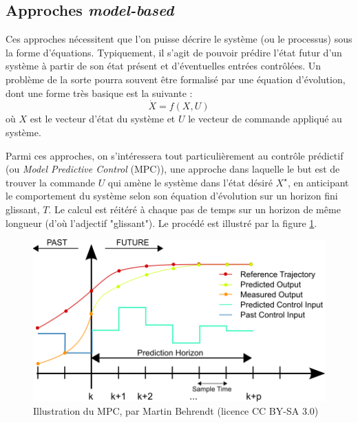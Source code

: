\documentclass[a4paper,12pt]{report}
\begin{document}

\subsection{Approches \textit{model-based}}
Ces approches nécessitent que l'on puisse décrire le système (ou le processus) sous la forme d'équations. Typiquement, il s'agit de pouvoir prédire l'état futur d'un système à partir de son état présent et d'éventuelles entrées contrôlées. Un problème de la sorte pourra souvent être formalisé par une équation d'évolution, dont une forme très basique est la suivante :
$$ \dot X = f(X, U) $$ où $X$ est le vecteur d'état du système et $U$ le vecteur de commande appliqué au système.

Parmi ces approches, on s'intéressera tout particulièrement au contrôle prédictif (ou \textit{Model Predictive Control} (MPC)), une approche dans laquelle le but est de trouver la commande $U$ qui amène le système dans l'état désiré $X^\star$, en anticipant le comportement du système selon son équation d'évolution sur un horizon fini glissant, $T$. Le calcul est réitéré à chaque pas de temps sur un horizon de même longueur (d'où l'adjectif "glissant"). Le procédé est illustré par la figure \ref{fig:mpc}.

\begin{figure}[!htb]
\centering
\includegraphics[width=12cm]{mpc_schema.png}
\caption{Illustration du MPC, par Martin Behrendt (licence CC BY-SA 3.0)}
\label{fig:mpc}
\end{figure}
\end{document}
